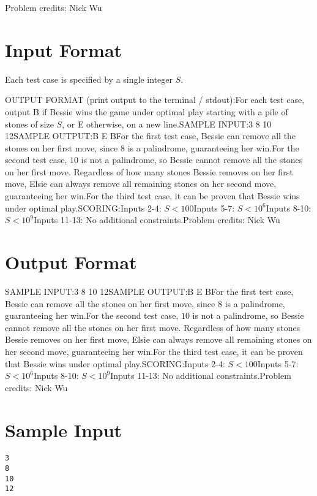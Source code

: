 \documentclass[12pt]{article}
\begin{document}
Problem credits: Nick Wu



\section*{Input Format}
Each test case is specified by a single integer $S$.

OUTPUT FORMAT (print output to the terminal / stdout):For each test case, output B if Bessie wins the game under optimal play starting
with a pile of stones of size $S$, or E otherwise, on a new line.SAMPLE INPUT:3
8
10
12SAMPLE OUTPUT:B
E
BFor the first test case, Bessie can remove all the stones on her first move,
since $8$ is a palindrome, guaranteeing her win.For the second test case, $10$ is not a palindrome, so Bessie cannot remove all
the stones on her first move. Regardless of how many stones  Bessie removes on
her first move, Elsie can always remove all remaining stones on her second move,
guaranteeing her win.For the third test case, it can be proven that Bessie wins under optimal play.SCORING:Inputs 2-4: $S<100$Inputs 5-7: $S<10^6$Inputs 8-10: $S<10^9$Inputs 11-13: No additional constraints.Problem credits: Nick Wu

\section*{Output Format}
SAMPLE INPUT:3
8
10
12SAMPLE OUTPUT:B
E
BFor the first test case, Bessie can remove all the stones on her first move,
since $8$ is a palindrome, guaranteeing her win.For the second test case, $10$ is not a palindrome, so Bessie cannot remove all
the stones on her first move. Regardless of how many stones  Bessie removes on
her first move, Elsie can always remove all remaining stones on her second move,
guaranteeing her win.For the third test case, it can be proven that Bessie wins under optimal play.SCORING:Inputs 2-4: $S<100$Inputs 5-7: $S<10^6$Inputs 8-10: $S<10^9$Inputs 11-13: No additional constraints.Problem credits: Nick Wu

\section*{Sample Input}
\begin{verbatim}
3
8
10
12
\end{verbatim}
\end{document}
